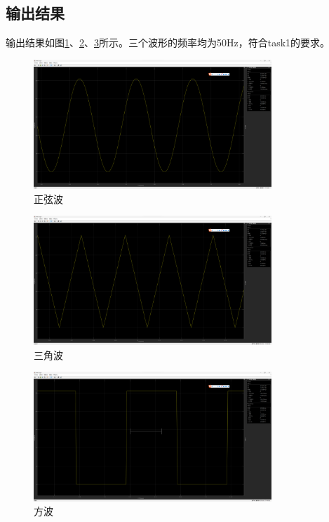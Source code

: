 \documentclass[UTF8]{ctexart}
\begin{document}
\subsection{输出结果}
\FloatBarrier
输出结果如图\ref{fig:sine}、\ref{fig:triangle}、\ref{fig:square}所示。三个波形的频率均为50Hz，符合task1的要求。
\begin{figure}[!ht]
    \centering
    \includegraphics[width=0.8\textwidth]{sine.png}
    \caption{正弦波}
    \label{fig:sine}
\end{figure}
\begin{figure}[!ht]
    \centering
    \includegraphics[width=0.8\textwidth]{triangle.png}
    \caption{三角波}
    \label{fig:triangle}
\end{figure}
\begin{figure}[!ht]
    \centering
    \includegraphics[width=0.8\textwidth]{square.png}
    \caption{方波}
    \label{fig:square}
\end{figure}
\FloatBarrier
\end{document}
